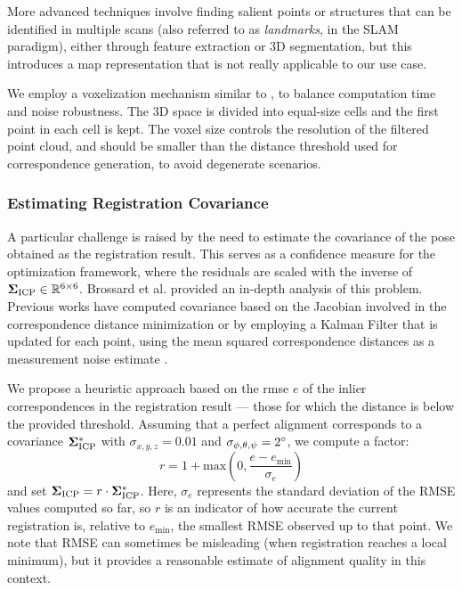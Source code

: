 More advanced techniques involve finding salient points or structures that can be identified in multiple scans (also referred to as \emph{landmarks}, in the SLAM paradigm), either through feature extraction \cite{fpfh} or 3D segmentation, but this introduces a map representation that is not really applicable to our use case.

We employ a voxelization mechanism similar to \cite{vizzo2023ral}, to balance computation time and noise robustness. The 3D space is divided into equal-size cells and the first point in each cell is kept. The voxel size controls the resolution of the filtered point cloud, and should be smaller than the distance threshold used for correspondence generation, to avoid degenerate scenarios.

\subsubsection{Estimating Registration Covariance}
\newcommand{\degrad}[1]{\text{rad}(#1)}
A particular challenge is raised by the need to estimate the covariance of the pose obtained as the registration result. This serves as a confidence measure for the optimization framework, where the residuals are scaled with the inverse of $\mathbf{\Sigma}_{\text{ICP}} \in {\mathbb{R}}^{6 \times 6}$.
Brossard et al. \cite{Brossard_2020} provided an in-depth analysis of this problem. Previous works have computed covariance based on the Jacobian involved in the correspondence distance minimization \cite{covarianceicp2} or by employing a Kalman Filter that is updated for each point, using the mean squared correspondence distances as a measurement noise estimate \cite{covarianceicp}.

We propose a heuristic approach based on the \acrfull{rmse} $e$ of the inlier correspondences in the registration result --- those for which the distance is below the provided threshold. Assuming that a perfect alignment corresponds to a covariance $\mathbf{\Sigma}_{\text{ICP}}^{*}$ with $\sigma_{x, y, z} = 0.01$ and $\sigma_{\phi, \theta, \psi} = 2\degree$,
we compute a factor:
\begin{equation}
	r = 1 + \text{max}\left(0, \frac{e-e_{\text{min}}}{\sigma_e}\right)
\end{equation}
and set $\mathbf{\Sigma}_{\text{ICP}} = r \cdot \mathbf{\Sigma}_{\text{ICP}}^{*}$. Here, $\sigma_e$ represents the standard deviation of the RMSE values computed so far, so $r$ is an indicator of how accurate the current registration is, relative to $e_{\text{min}}$, the smallest RMSE observed up to that point. We note that RMSE can sometimes be misleading (\eg when registration reaches a local minimum), but it provides a reasonable estimate of alignment quality in this context.


